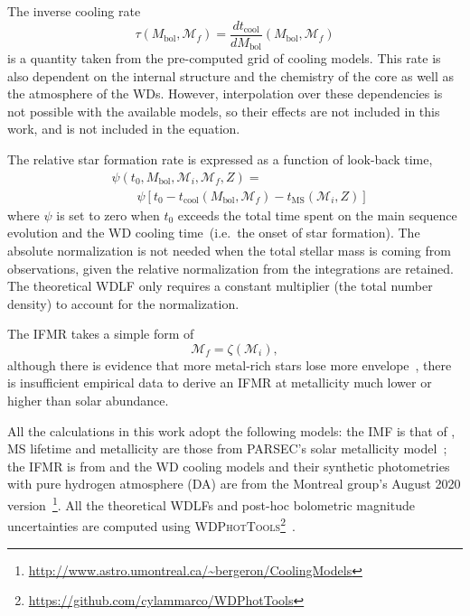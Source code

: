 \documentclass[fleqn,usenatbib]{mnras}
\begin{document}
The inverse cooling rate
\begin{equation}
    \tau(M_\mathrm{bol}, \mathcal{M}_f) = \dfrac{dt_{\mathrm{cool}}}{dM_\mathrm{bol}} \left( M_\mathrm{bol}, \mathcal{M}_f \right)
\end{equation}
is a quantity taken from the pre-computed grid of cooling models. This rate is
also dependent on the internal structure and the chemistry of the core as well
as the atmosphere of the WDs. However, interpolation over these dependencies is
not possible with the available models, so their effects are not included in
this work, and is not included in the equation.

The relative star formation rate is expressed as a function of look-back time,
\begin{align}
    &\psi(t_0, M_\mathrm{bol}, \mathcal{M}_i, \mathcal{M}_f, Z) =\\
    &\qquad\psi\left[t_0 - t_{\mathrm{cool}}\left(M_\mathrm{bol}, \mathcal{M}_f\right) - t_{\mathrm{MS}}\left(\mathcal{M}_i, Z\right)\right]
\end{align}
where $\psi$ is set to zero when $t_0$ exceeds the total time spent on the
main sequence evolution and the WD cooling time~(i.e.\ the onset of star 
formation). The absolute normalization is not needed when the total stellar
mass is coming from observations, given the relative normalization from the 
integrations are retained. The theoretical WDLF only requires a constant
multiplier (the total number density) to account for the normalization.

The IFMR takes a simple form of
\begin{equation}
    \mathcal{M}_f = \zeta(\mathcal{M}_i),
\end{equation}
although there is evidence that more metal-rich stars lose more
envelope~\citep{2007ApJ...671..761K}, there is insufficient empirical data
to derive an IFMR at metallicity much lower or higher than solar abundance.

All the calculations in this work adopt the following models: the IMF is that of
\citet{2003PASP..115..763C}, MS lifetime and metallicity are those from
PARSEC's solar metallicity model~\citep[Z=0.017, Y=0.279;][]{2012MNRAS.427..127B};
the IFMR is from \citet{2008MNRAS.387.1693C} and the WD cooling models and their
synthetic photometries with pure hydrogen atmosphere (DA) are from the Montreal
group's August 2020 version~\citep{2020ApJ...901...93B}\footnote{\url{http://www.astro.umontreal.ca/~bergeron/CoolingModels}}.
All the theoretical WDLFs and post-hoc bolometric magnitude uncertainties are
computed using \textsc{WDPhotTools}\footnote{\url{https://github.com/cylammarco/WDPhotTools}}~\citep{marco_c_lam_2022_6595029, 
2022RASTI...1...81L}.
\end{document}
